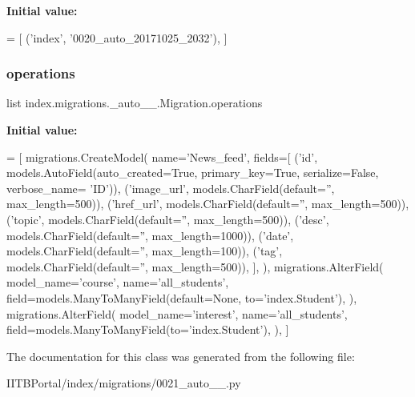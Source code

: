 {\bfseries Initial value\+:}
\begin{DoxyCode}
=  [
        (\textcolor{stringliteral}{'index'}, \textcolor{stringliteral}{'0020\_auto\_20171025\_2032'}),
    ]
\end{DoxyCode}
\mbox{\label{classindex_1_1migrations_1_10021__auto__20171026__0644_1_1Migration_a3ca04c523f45005038dde878464ba80c}} 
\subsubsection{\texorpdfstring{operations}{operations}}
{\footnotesize\ttfamily list index.\+migrations.\+\_\+auto\+\_\+\_.\+Migration.\+operations\hspace{0.3cm}{\ttfamily [static]}}

{\bfseries Initial value\+:}
\begin{DoxyCode}
=  [
        migrations.CreateModel(
            name=\textcolor{stringliteral}{'News\_feed'},
            fields=[
                (\textcolor{stringliteral}{'id'}, models.AutoField(auto\_created=\textcolor{keyword}{True}, primary\_key=\textcolor{keyword}{True}, serialize=\textcolor{keyword}{False}, verbose\_name=\textcolor{stringliteral}{
      'ID'})),
                (\textcolor{stringliteral}{'image\_url'}, models.CharField(default=\textcolor{stringliteral}{''}, max\_length=500)),
                (\textcolor{stringliteral}{'href\_url'}, models.CharField(default=\textcolor{stringliteral}{''}, max\_length=500)),
                (\textcolor{stringliteral}{'topic'}, models.CharField(default=\textcolor{stringliteral}{''}, max\_length=500)),
                (\textcolor{stringliteral}{'desc'}, models.CharField(default=\textcolor{stringliteral}{''}, max\_length=1000)),
                (\textcolor{stringliteral}{'date'}, models.CharField(default=\textcolor{stringliteral}{''}, max\_length=100)),
                (\textcolor{stringliteral}{'tag'}, models.CharField(default=\textcolor{stringliteral}{''}, max\_length=500)),
            ],
        ),
        migrations.AlterField(
            model\_name=\textcolor{stringliteral}{'course'},
            name=\textcolor{stringliteral}{'all\_students'},
            field=models.ManyToManyField(default=\textcolor{keywordtype}{None}, to=\textcolor{stringliteral}{'index.Student'}),
        ),
        migrations.AlterField(
            model\_name=\textcolor{stringliteral}{'interest'},
            name=\textcolor{stringliteral}{'all\_students'},
            field=models.ManyToManyField(to=\textcolor{stringliteral}{'index.Student'}),
        ),
    ]
\end{DoxyCode}


The documentation for this class was generated from the following file\+:\begin{DoxyCompactItemize}
\item 
I\+I\+T\+B\+Portal/index/migrations/0021\+\_\+auto\+\_\+\_.\+py\end{DoxyCompactItemize}

